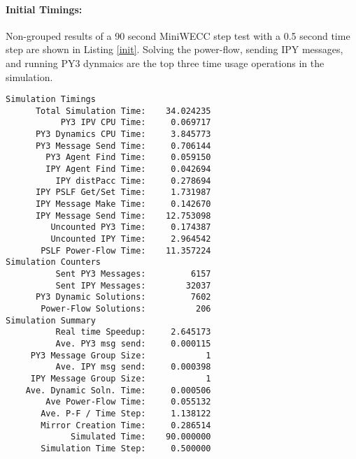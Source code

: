 \documentclass[12pt]{article}
\begin{document}
\begin{multicols}{2}
\raggedright
\paragraph{Initial Timings:} Non-grouped results of a 90 second MiniWECC step test with a 0.5 second time step are shown in Listing \ref{init}. Solving the power-flow, sending IPY messages, and running PY3 dynmaics are the top three time usage operations in the simulation. 
\begin{lstlisting}[caption=Initial timings and counters., label=init]
Simulation Timings
      Total Simulation Time:    34.024235
           PY3 IPV CPU Time:     0.069717
      PY3 Dynamics CPU Time:     3.845773
      PY3 Message Send Time:     0.706144
        PY3 Agent Find Time:     0.059150
        IPY Agent Find Time:     0.042694
          IPY distPacc Time:     0.278694
      IPY PSLF Get/Set Time:     1.731987
      IPY Message Make Time:     0.142670
      IPY Message Send Time:    12.753098
         Uncounted PY3 Time:     0.174387
         Uncounted IPY Time:     2.964542
       PSLF Power-Flow Time:    11.357224
Simulation Counters
          Sent PY3 Messages:         6157
          Sent IPY Messages:        32037
      PY3 Dynamic Solutions:         7602
       Power-Flow Solutions:          206
Simulation Summary
          Real time Speedup:     2.645173
          Ave. PY3 msg send:     0.000115
     PY3 Message Group Size:            1
          Ave. IPY msg send:     0.000398
     IPY Message Group Size:            1
    Ave. Dynamic Soln. Time:     0.000506
        Ave Power-Flow Time:     0.055132
       Ave. P-F / Time Step:     1.138122
       Mirror Creation Time:     0.286514
             Simulated Time:    90.000000
       Simulation Time Step:     0.500000
\end{lstlisting}
\vfill\null
\columnbreak


\end{multicols}
\end{document}
